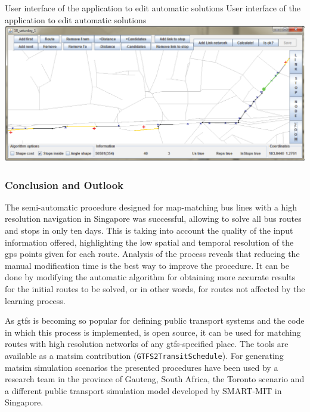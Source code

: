 \createfigure
{User interface of the application to edit automatic solutions}
{User interface of the application to edit automatic solutions}
{\label{fig:Application}}
{\includegraphics[width=1.0\textwidth]{extending/figures/semiAuto/Application.png}}
{}

\subsubsection{Conclusion and Outlook}
The semi-automatic procedure designed for map-matching bus lines with a high resolution navigation in Singapore was successful, allowing to solve all bus routes and stops in only ten days. This is taking into account the quality of the input information offered, highlighting the low spatial and temporal resolution of the \gls{gps} points given for each route. Analysis of the process reveals that reducing the manual modification time is the best way to improve the procedure. It can be done by modifying the automatic algorithm for obtaining more accurate results for the initial routes to be solved, or in other words, for routes not affected by the learning process.

As \gls{gtfs} is becoming so popular for defining public transport systems and the code in which this process is implemented, is open source, it can be used for matching routes with high resolution networks of any \gls{gtfs}-specified place. The tools are available as a \gls{matsim} \gls{contribution} (\lstinline|GTFS2TransitSchedule|). For generating \gls{matsim} simulation scenarios the presented procedures have been used by a research team in the province of Gauteng, South Africa, the Toronto scenario and a different public transport simulation model developed by SMART-MIT in Singapore.

